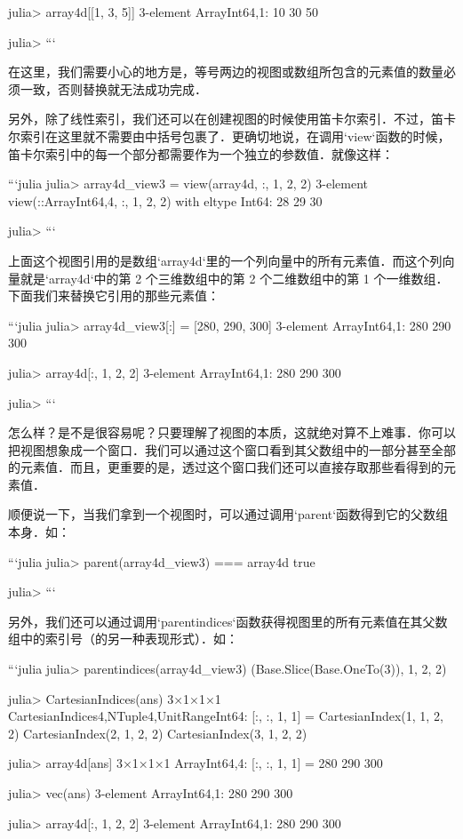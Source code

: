 julia> array4d[[1, 3, 5]]
3-element Array{Int64,1}:
 10
 30
 50

julia> 
```

在这里，我们需要小心的地方是，等号两边的视图或数组所包含的元素值的数量必须一致，否则替换就无法成功完成．

另外，除了线性索引，我们还可以在创建视图的时候使用笛卡尔索引．不过，笛卡尔索引在这里就不需要由中括号包裹了．更确切地说，在调用`view`函数的时候，笛卡尔索引中的每一个部分都需要作为一个独立的参数值．就像这样：

```julia
julia> array4d_view3 = view(array4d, :, 1, 2, 2)
3-element view(::Array{Int64,4}, :, 1, 2, 2) with eltype Int64:
 28
 29
 30

julia>  
```

上面这个视图引用的是数组`array4d`里的一个列向量中的所有元素值．而这个列向量就是`array4d`中的第 2 个三维数组中的第 2 个二维数组中的第 1 个一维数组．下面我们来替换它引用的那些元素值：

```julia
julia> array4d_view3[:] = [280, 290, 300]
3-element Array{Int64,1}:
 280
 290
 300

julia> array4d[:, 1, 2, 2]
3-element Array{Int64,1}:
 280
 290
 300

julia> 
```

怎么样？是不是很容易呢？只要理解了视图的本质，这就绝对算不上难事．你可以把视图想象成一个窗口．我们可以通过这个窗口看到其父数组中的一部分甚至全部的元素值．而且，更重要的是，透过这个窗口我们还可以直接存取那些看得到的元素值．

顺便说一下，当我们拿到一个视图时，可以通过调用`parent`函数得到它的父数组本身．如：

```julia
julia> parent(array4d_view3) === array4d
true

julia> 
```

另外，我们还可以通过调用`parentindices`函数获得视图里的所有元素值在其父数组中的索引号（的另一种表现形式）．如：

```julia
julia> parentindices(array4d_view3)
(Base.Slice(Base.OneTo(3)), 1, 2, 2)

julia> CartesianIndices(ans)
3×1×1×1 CartesianIndices{4,NTuple{4,UnitRange{Int64}}}:
[:, :, 1, 1] =
 CartesianIndex(1, 1, 2, 2)
 CartesianIndex(2, 1, 2, 2)
 CartesianIndex(3, 1, 2, 2)

julia> array4d[ans]
3×1×1×1 Array{Int64,4}:
[:, :, 1, 1] =
 280
 290
 300

julia> vec(ans)
3-element Array{Int64,1}:
 280
 290
 300

julia> array4d[:, 1, 2, 2]
3-element Array{Int64,1}:
 280
 290
 300

